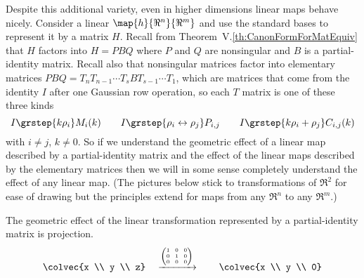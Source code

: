 Despite this additional variety, 
even in higher dimensions linear maps behave nicely.
Consider a linear $\map{h}{\Re^n}{\Re^m}$ and
use the standard bases to represent it by a matrix $H$.
Recall from Theorem~V.\ref{th:CanonFormForMatEquiv} 
that $H$ factors into $H=PBQ$ 
where $P$ and $Q$ are nonsingular and $B$ is a partial-identity matrix.
Recall also that nonsingular matrices
factor into elementary 
matrices
$PBQ=T_nT_{n-1}\cdots T_sBT_{s-1}\cdots T_1$,
which are matrices that
come from the identity $I$ after one Gaussian row operation,
so each $T$ matrix is one of these three kinds
\begin{equation*}
  I\grstep{k\rho_i}M_i(k) 
  \qquad 
  I\grstep{\rho_i\leftrightarrow\rho_j}P_{i,j}  
  \qquad
  I\grstep{k\rho_i+\rho_j}C_{i,j}(k) 
\end{equation*}
with $i\neq j$, $k\neq 0$.
So if we understand the geometric effect of a linear map described
by a partial-identity matrix and the effect of the linear maps
described by the elementary matrices then we will in some sense
completely understand the effect of any linear map.
(The pictures below stick to transformations of $\Re^2$ for ease of drawing
but the principles extend for maps from any $\Re^n$ to any $\Re^m$.)

The geometric effect of the linear transformation represented by a  
partial-identity matrix is projection.
\begin{equation*}
  \colvec{x \\ y  \\ z}
  \quad\xrightarrow{{\text{\tiny$\displaystyle\left(\begin{array}[r]{@{}c@{\hspace{0.8em}}c@{\hspace{0.8em}}c@{}}
                1  &0  &0 \\
                0  &1  &0 \\
                0  &0  &0
          \end{array}\right)$}}}
  \qquad
  \colvec{x \\ y  \\ 0}
\end{equation*}

